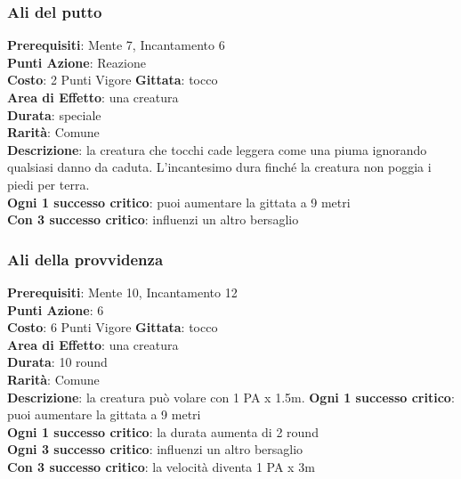 \documentclass[12pt,a4paper,twoside,openany]{book}
\begin{document}
\begin{multicols}{2}


\subsubsection*{Ali del putto}
\textbf{Prerequisiti}: Mente 7, Incantamento 6\\
\textbf{Punti Azione}: Reazione\\
\textbf{Costo}: 2 Punti Vigore
\textbf{Gittata}: tocco \\
\textbf{Area di Effetto}: una creatura\\
\textbf{Durata}: speciale\\
\textbf{Rarità}: Comune\\
\textbf{Descrizione}: la creatura che tocchi cade leggera come una piuma ignorando qualsiasi danno da caduta. L'incantesimo dura finché la creatura non poggia i piedi per terra.\\
\textbf{Ogni 1 successo critico}: puoi aumentare la gittata a 9 metri\\
\textbf{Con 3 successo critico}: influenzi un altro bersaglio

\subsubsection*{Ali della provvidenza}
\textbf{Prerequisiti}: Mente 10, Incantamento 12\\
\textbf{Punti Azione}: 6\\
\textbf{Costo}: 6 Punti Vigore
\textbf{Gittata}: tocco \\
\textbf{Area di Effetto}: una creatura\\
\textbf{Durata}: 10 round\\
\textbf{Rarità}: Comune\\
\textbf{Descrizione}: la creatura può volare con 1 PA x 1.5m.
\textbf{Ogni 1 successo critico}: puoi aumentare la gittata a 9 metri\\
\textbf{Ogni 1 successo critico}: la durata aumenta di 2 round\\
\textbf{Ogni 3 successo critico}: influenzi un altro bersaglio\\
\textbf{Con 3 successo critico}: la velocità diventa 1 PA x 3m



\end{multicols}
\end{document}
